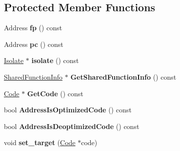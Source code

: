 \subsection*{Protected Member Functions}
\begin{DoxyCompactItemize}
\item 
Address {\bfseries fp} () const \hypertarget{classv8_1_1internal_1_1_i_c_a07c151e2ed2ae7fba51c663fbacc4e41}{}\label{classv8_1_1internal_1_1_i_c_a07c151e2ed2ae7fba51c663fbacc4e41}

\item 
Address {\bfseries pc} () const \hypertarget{classv8_1_1internal_1_1_i_c_a43827552cd6d3b5e7c919658a37877e1}{}\label{classv8_1_1internal_1_1_i_c_a43827552cd6d3b5e7c919658a37877e1}

\item 
\hyperlink{classv8_1_1internal_1_1_isolate}{Isolate} $\ast$ {\bfseries isolate} () const \hypertarget{classv8_1_1internal_1_1_i_c_ad57d9e6e622dff87dfb692234f585517}{}\label{classv8_1_1internal_1_1_i_c_ad57d9e6e622dff87dfb692234f585517}

\item 
\hyperlink{classv8_1_1internal_1_1_shared_function_info}{Shared\+Function\+Info} $\ast$ {\bfseries Get\+Shared\+Function\+Info} () const \hypertarget{classv8_1_1internal_1_1_i_c_a392fca27e8e46939631bc70d8433ed67}{}\label{classv8_1_1internal_1_1_i_c_a392fca27e8e46939631bc70d8433ed67}

\item 
\hyperlink{classv8_1_1internal_1_1_code}{Code} $\ast$ {\bfseries Get\+Code} () const \hypertarget{classv8_1_1internal_1_1_i_c_acf0accf763cc814eb2e8d2fc8951daf8}{}\label{classv8_1_1internal_1_1_i_c_acf0accf763cc814eb2e8d2fc8951daf8}

\item 
bool {\bfseries Address\+Is\+Optimized\+Code} () const \hypertarget{classv8_1_1internal_1_1_i_c_a7995a356c8981906351523a858561685}{}\label{classv8_1_1internal_1_1_i_c_a7995a356c8981906351523a858561685}

\item 
bool {\bfseries Address\+Is\+Deoptimized\+Code} () const \hypertarget{classv8_1_1internal_1_1_i_c_ac04750157fe042529e852a117c807014}{}\label{classv8_1_1internal_1_1_i_c_ac04750157fe042529e852a117c807014}

\item 
void {\bfseries set\+\_\+target} (\hyperlink{classv8_1_1internal_1_1_code}{Code} $\ast$code)\hypertarget{classv8_1_1internal_1_1_i_c_ad68fe519b2f184f3a241d731051066e7}{}\label{classv8_1_1internal_1_1_i_c_ad68fe519b2f184f3a241d731051066e7}


\end{DoxyCompactItemize}
